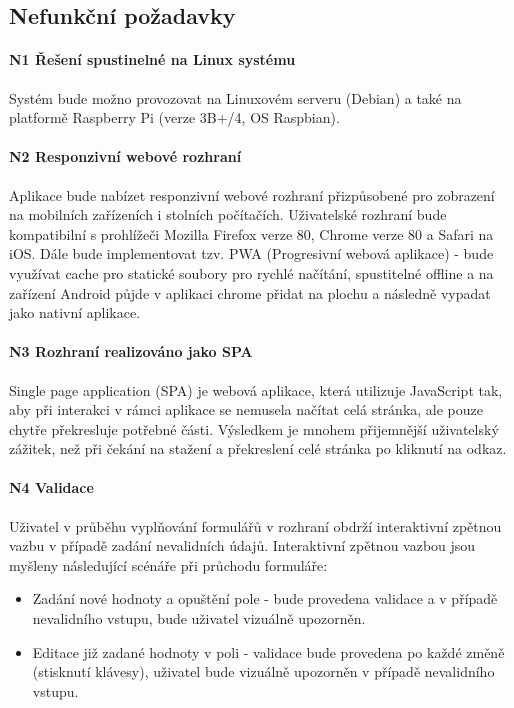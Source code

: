 \subsection{Nefunkční požadavky}

\paragraph{N1 Řešení spustinelné na Linux systému}
Systém bude možno provozovat na Linuxovém serveru (Debian) a také na platformě Raspberry Pi (verze 3B+/4, OS Raspbian).

\paragraph{N2 Responzivní webové rozhraní}
Aplikace bude nabízet responzivní webové rozhraní přizpůsobené pro zobrazení na mobilních zařízeních i stolních počítačích. Uživatelské rozhraní bude kompatibilní s prohlížeči Mozilla Firefox verze 80, Chrome verze 80 a Safari na iOS. Dále bude implementovat tzv. PWA (Progresivní webová aplikace) - bude využívat cache pro statické soubory pro rychlé načítání, spustitelné offline a na zařízení Android půjde v aplikaci chrome přidat na plochu a následně vypadat jako nativní aplikace.

\paragraph{N3 Rozhraní realizováno jako SPA}
Single page application (SPA) je webová aplikace, která utilizuje JavaScript tak, aby při interakci v rámci aplikace se nemusela načítat celá stránka, ale pouze chytře překresluje potřebné části. Výsledkem je mnohem přijemnější uživatelský zážitek, než při čekání na stažení a překreslení celé stránka po kliknutí na odkaz.

\paragraph{N4 Validace}
Uživatel v průběhu vyplňování formulářů v rozhraní obdrží interaktivní zpětnou vazbu v případě zadání nevalidních údajů. Interaktivní zpětnou vazbou jsou myšleny následující scénáře při průchodu formuláře:
\begin{itemize}
    \item Zadání nové hodnoty a opuštění pole - bude provedena validace a v případě nevalidního vstupu, bude uživatel vizuálně  upozorněn.
    \item Editace již zadané hodnoty v poli - validace bude provedena po každé změně (stisknutí klávesy), uživatel bude vizuálně upozorněn v případě nevalidního vstupu.
\end{itemize}

